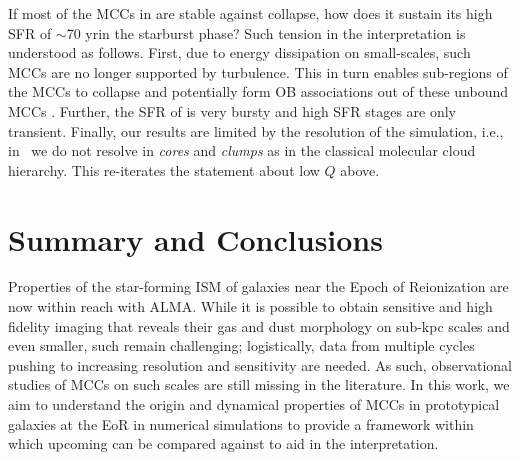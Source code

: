 \IfFileExists{emulateapjlegacy.cls}{\documentclass[iop]{emulateapjlegacy}}{\documentclass[iop]{emulateapj}}
\newcommand{\MM}[1]{({\bf \color{mmcolor} MM: #1})}
\begin{document}
If most of the MCCs in \flower are stable against collapse, how does it sustain its high SFR of $\sim$70\,\Msun\,yr\pmOne in the starburst phase? Such tension in the interpretation is understood as follows.
%
First, due to energy dissipation on small-scales, such MCCs are no longer supported by turbulence. This in turn enables sub-regions of the MCCs to collapse and potentially form OB associations out of these unbound MCCs \citep{Clark04a, Clark05a}.
Further, the SFR of \flower is very bursty and high SFR stages are only transient.
%
Finally, our results are limited by the resolution of the simulation, i.e., in \flower~we do not resolve \SF in {\it cores} and {\it clumps} as in the classical molecular cloud hierarchy. This re-iterates the statement about low $Q$ above.

\section{Summary and Conclusions}      \label{sec:conclusion}

Properties of the star-forming ISM of galaxies near the Epoch of Reionization are now within reach with ALMA. While it is possible to obtain sensitive and high fidelity imaging that reveals their gas and dust morphology on sub-kpc scales and even smaller, such \obs remain challenging; logistically, data from multiple cycles pushing to increasing resolution and sensitivity are needed. As such, observational studies of MCCs on such scales are still missing in the literature.
%
In this work, we aim to understand the origin and dynamical properties of MCCs in prototypical galaxies at the EoR in numerical simulations to provide a framework within which upcoming \obs can be compared against to aid in the interpretation.
\end{document}
